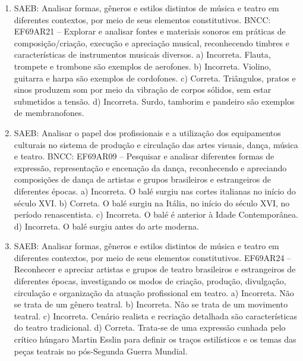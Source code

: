 
\begin{enumerate}
\item
SAEB: Analisar formas, gêneros e estilos distintos de música e teatro
em diferentes contextos, por meio de seus elementos constitutivos.
BNCC: EF69AR21 -- Explorar e analisar fontes e materiais sonoros em práticas de composição/criação,
execução e apreciação musical, reconhecendo timbres e características de instrumentos
musicais diversos.
a) Incorreta. Flauta, trompete e trombone são exemplos de aerofones.
b) Incorreta. Violino, guitarra e harpa são exemplos de cordofones.
c) Correta. Triângulos, pratos e sinos produzem som por meio da vibração 
de corpos sólidos, sem estar submetidos a tensão.
d) Incorreta. Surdo, tamborim e pandeiro são exemplos de membranofones.

\item
SAEB: Analisar o papel dos profissionais e a utilização dos
equipamentos culturais no sistema de produção e circulação das artes
visuais, dança, música e teatro.
BNCC: EF69AR09 -- Pesquisar e analisar diferentes formas de expressão, representação e encenação
da dança, reconhecendo e apreciando composições de dança de artistas e grupos brasileiros e
estrangeiros de diferentes épocas.
a) Incorreta. O balé surgiu nas cortes italianas no início do século XVI.
b) Correta. O balé surgiu na Itália, no início do século XVI, no período renascentista.
c) Incorreta. O balé é anterior à Idade Contemporânea.
d) Incorreta. O balé surgiu antes do arte moderna.

\item
SAEB: Analisar formas, gêneros e estilos distintos de música e teatro
em diferentes contextos, por meio de seus elementos constitutivos.
EF69AR24 -- Reconhecer e apreciar artistas e grupos de teatro brasileiros e estrangeiros de
diferentes épocas, investigando os modos de criação, produção, divulgação, circulação e
organização da atuação profissional em teatro.
a)  Incorreta. Não se trata de um gênero teatral.
b)  Incorreta. Não se trata de um movimento teatral.
c)  Incorreta. Cenário realista e recriação detalhada são características
  do teatro tradicional.
d) Correta. Trata-se de uma expressão cunhada pelo crítico húngaro Martin Esslin
  para definir os traços estilísticos e os temas das peças teatrais no
  pós-Segunda Guerra Mundial.
\end{enumerate}



